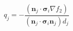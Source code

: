 $$
q_j = - \frac{\left(\mathbf n_j\cdot\boldsymbol\sigma_i\nabla f_2\right)}{\left(\mathbf n_j\cdot\boldsymbol\sigma_i\mathbf n_j\right) d_j}
$$

